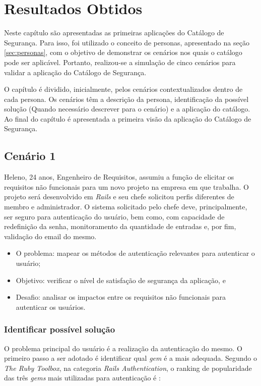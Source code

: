 \chapter{Resultados Obtidos}
\label{chap:resultadosObtidos}

Neste capítulo são apresentadas as primeiras aplicações do Catálogo de Segurança. Para isso, foi utilizado o conceito de personas, apresentado na seção \ref{sec:personas}, com o objetivo de demonstrar os cenários nos quais o catálogo pode ser aplicável. Portanto, realizou-se a simulação de cinco cenários para validar a aplicação do Catálogo de Segurança. 

O capítulo é dividido, inicialmente, pelos cenários contextualizados dentro de cada persona. Os cenários têm a descrição da persona, identificação da possível solução (Quando necessário descrever para o cenário) e a aplicação do catálogo. Ao final do capítulo é apresentada a primeira visão da aplicação do Catálogo de Segurança.  


\section{Cenário 1}
\label{subsec:persona1}

Heleno, 24 anos, Engenheiro de Requisitos, assumiu a função de elicitar os requisitos não funcionais para um novo projeto na empresa em que trabalha. O projeto será desenvolvido em \textit{Rails} e seu chefe solicitou perfis diferentes de membro e administrador. O sistema solicitado pelo chefe deve, principalmente, ser seguro para autenticação do usuário, bem como, com capacidade de redefinição da senha, monitoramento da quantidade de entradas e, por fim, validação do email do mesmo.

\begin{itemize}
	\item O problema: mapear os métodos de autenticação relevantes para autenticar o usuário; 
	\item Objetivo: verificar o nível de satisfação de segurança da aplicação, e
	\item Desafio: analisar os impactos entre os requisitos não funcionais para autenticar os usuários.
\end{itemize}


\subsection{Identificar possível solução}

O problema principal do usuário é a realização da autenticação do mesmo. O primeiro passo a ser adotado é identificar qual \textit{gem} é a mais adequada. Segundo o \textit{The Ruby Toolbox}, na categoria \textit{Rails Authentication}, o ranking de popularidade das três \textit{gems} mais utilizadas para autenticação é \cite{rubytoolbox}:

